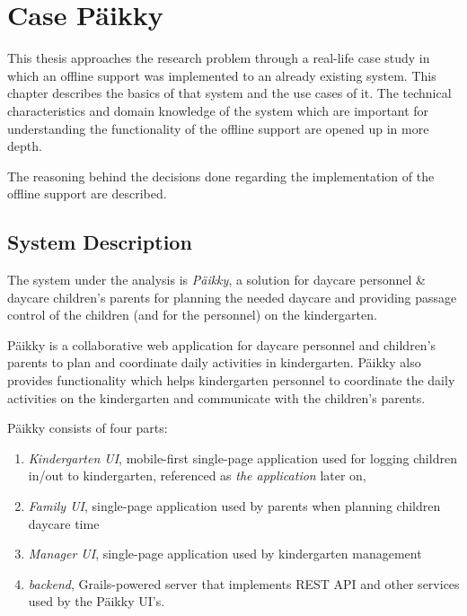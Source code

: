 
\chapter{Case Päikky}

This thesis approaches the research problem through a real-life case study in which an offline support was implemented to an already existing system. This chapter describes the basics of that system and the use cases of it. The technical characteristics and domain knowledge of the system which are important for understanding the functionality of the offline support are opened up in more depth. 

The reasoning behind the decisions done regarding the implementation of the offline support are described.


\section{System Description}

The system under the analysis is \textit{Päikky}, a solution for daycare personnel & daycare children’s parents for planning the needed daycare and providing passage control of the children (and for the personnel) on the kindergarten. 

Päikky is a collaborative web application for daycare personnel and children's parents to plan and coordinate daily activities in kindergarten. Päikky also provides functionality which helps kindergarten personnel to coordinate the daily activities on the kindergarten and communicate with the children's parents.

Päikky consists of four parts:

\begin{enumerate}
	\item \textit{Kindergarten UI}, mobile-first single-page application used for logging children in/out to kindergarten, referenced as \textit{the application} later on,
	\item \textit{Family UI}, single-page application used by parents when planning children daycare time
	\item \textit{Manager UI}, single-page application used by kindergarten management 
	\item \textit{backend}, Grails-powered server that implements REST API and other services used by the Päikky UI's.
\end{enumerate}

